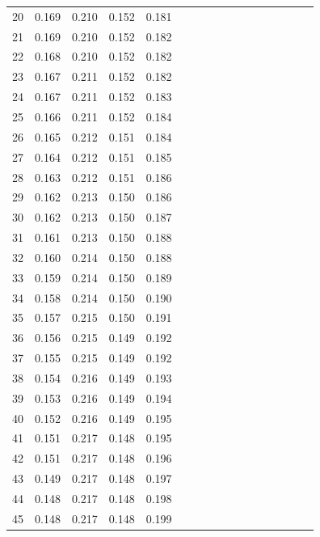 \documentclass{report}
\begin{document}
\begin{table}
\begin{tabular}{|c|cccc|cccc|cccc|cccc|}
20 & 0.169 & 0.210 & 0.152 & 0.181 & & & & & & & & & & & &\\
21 & 0.169 & 0.210 & 0.152 & 0.182 & & & & & & & & & & & &\\
22 & 0.168 & 0.210 & 0.152 & 0.182 & & & & & & & & & & & &\\
23 & 0.167 & 0.211 & 0.152 & 0.182 & & & & & & & & & & & &\\
24 & 0.167 & 0.211 & 0.152 & 0.183 & & & & & & & & & & & &\\
25 & 0.166 & 0.211 & 0.152 & 0.184 & & & & & & & & & & & &\\
26 & 0.165 & 0.212 & 0.151 & 0.184 & & & & & & & & & & & &\\
27 & 0.164 & 0.212 & 0.151 & 0.185 & & & & & & & & & & & &\\
28 & 0.163 & 0.212 & 0.151 & 0.186 & & & & & & & & & & & &\\
29 & 0.162 & 0.213 & 0.150 & 0.186 & & & & & & & & & & & &\\
30 & 0.162 & 0.213 & 0.150 & 0.187 & & & & & & & & & & & &\\
31 & 0.161 & 0.213 & 0.150 & 0.188 & & & & & & & & & & & &\\
32 & 0.160 & 0.214 & 0.150 & 0.188 & & & & & & & & & & & &\\
33 & 0.159 & 0.214 & 0.150 & 0.189 & & & & & & & & & & & &\\
34 & 0.158 & 0.214 & 0.150 & 0.190 & & & & & & & & & & & &\\
35 & 0.157 & 0.215 & 0.150 & 0.191 & & & & & & & & & & & &\\
36 & 0.156 & 0.215 & 0.149 & 0.192 & & & & & & & & & & & &\\
37 & 0.155 & 0.215 & 0.149 & 0.192 & & & & & & & & & & & &\\
38 & 0.154 & 0.216 & 0.149 & 0.193 & & & & & & & & & & & &\\
39 & 0.153 & 0.216 & 0.149 & 0.194 & & & & & & & & & & & &\\
40 & 0.152 & 0.216 & 0.149 & 0.195 & & & & & & & & & & & &\\
41 & 0.151 & 0.217 & 0.148 & 0.195 & & & & & & & & & & & &\\
42 & 0.151 & 0.217 & 0.148 & 0.196 & & & & & & & & & & & &\\
43 & 0.149 & 0.217 & 0.148 & 0.197 & & & & & & & & & & & &\\
44 & 0.148 & 0.217 & 0.148 & 0.198 & & & & & & & & & & & &\\
45 & 0.148 & 0.217 & 0.148 & 0.199 & & & & & & & & & & & &\\

\end{tabular}
\end{table}
\end{document}
